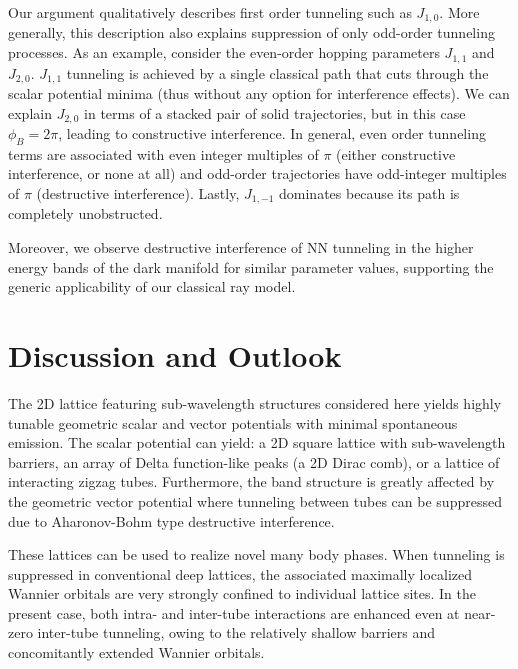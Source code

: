 \documentclass[aps,pra,twocolumn,showpacs,superscriptaddress,floatfix,longbibliography]{revtex4-1}
\begin{document}
Our argument qualitatively describes first order tunneling such as $J_{1,0}$.
More generally, this description also explains suppression of only odd-order tunneling processes. 
As an example, consider the even-order hopping parameters $J_{1,1}$ and $J_{2,0}$.
$J_{1,1}$ tunneling is achieved by a single classical path that cuts through the scalar potential minima (thus without any option for interference effects).
We can explain $J_{2,0}$ in terms of a stacked pair of solid trajectories, but in this case $\phi_B = 2\pi$, leading to constructive interference.
In general, even order tunneling terms are associated with even integer multiples of $\pi$ (either constructive interference, or none at all) and odd-order trajectories have odd-integer multiples of $\pi$ (destructive interference).
Lastly, $J_{1,-1}$ dominates because its path is completely unobstructed.

Moreover, we observe destructive interference of NN tunneling in the higher energy bands of the dark manifold for similar parameter values, supporting the generic applicability of our classical ray model.



\section{Discussion and Outlook}\label{sec:outlook}

The 2D lattice featuring sub-wavelength structures considered here yields highly tunable geometric scalar and vector potentials with minimal spontaneous emission. 
The scalar potential can yield: a 2D square lattice with sub-wavelength barriers, an array of Delta function-like peaks (a 2D Dirac comb), or a lattice of interacting zigzag tubes.
Furthermore, the band structure is greatly affected by the geometric vector potential where tunneling between tubes can be suppressed due to Aharonov-Bohm type destructive interference. 

These lattices can be used to realize novel many body phases.
When tunneling is suppressed in conventional deep lattices, the associated maximally localized Wannier orbitals are very strongly confined to individual lattice sites.
In the present case, both intra- and inter-tube interactions are enhanced even at near-zero inter-tube tunneling, owing to the relatively shallow barriers and concomitantly extended Wannier orbitals.
\end{document}
